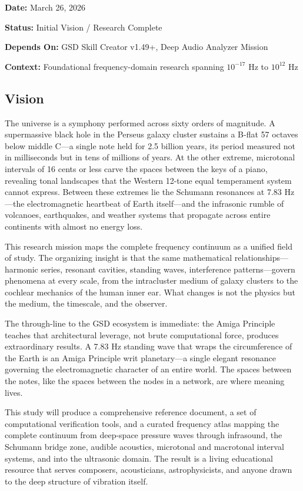 \documentclass[11pt,letterpaper]{article}
\newcommand{\metafield}[2]{\textbf{\sffamily #1} #2\par}
\begin{document}
\metafield{Date:}{March 26, 2026}
\metafield{Status:}{Initial Vision / Research Complete}
\metafield{Depends On:}{GSD Skill Creator v1.49+, Deep Audio Analyzer Mission}
\metafield{Context:}{Foundational frequency-domain research spanning $10^{-17}$ Hz to $10^{12}$ Hz}

\subsection{Vision}

The universe is a symphony performed across sixty orders of magnitude. A supermassive black hole in the Perseus galaxy cluster sustains a B-flat 57 octaves below middle C---a single note held for 2.5 billion years, its period measured not in milliseconds but in tens of millions of years. At the other extreme, microtonal intervals of 16 cents or less carve the spaces between the keys of a piano, revealing tonal landscapes that the Western 12-tone equal temperament system cannot express. Between these extremes lie the Schumann resonances at 7.83 Hz---the electromagnetic heartbeat of Earth itself---and the infrasonic rumble of volcanoes, earthquakes, and weather systems that propagate across entire continents with almost no energy loss.

This research mission maps the complete frequency continuum as a unified field of study. The organizing insight is that the same mathematical relationships---harmonic series, resonant cavities, standing waves, interference patterns---govern phenomena at every scale, from the intracluster medium of galaxy clusters to the cochlear mechanics of the human inner ear. What changes is not the physics but the medium, the timescale, and the observer.

The through-line to the GSD ecosystem is immediate: the Amiga Principle teaches that architectural leverage, not brute computational force, produces extraordinary results. A 7.83 Hz standing wave that wraps the circumference of the Earth is an Amiga Principle writ planetary---a single elegant resonance governing the electromagnetic character of an entire world. The spaces between the notes, like the spaces between the nodes in a network, are where meaning lives.

This study will produce a comprehensive reference document, a set of computational verification tools, and a curated frequency atlas mapping the complete continuum from deep-space pressure waves through infrasound, the Schumann bridge zone, audible acoustics, microtonal and macrotonal interval systems, and into the ultrasonic domain. The result is a living educational resource that serves composers, acousticians, astrophysicists, and anyone drawn to the deep structure of vibration itself.
\end{document}
